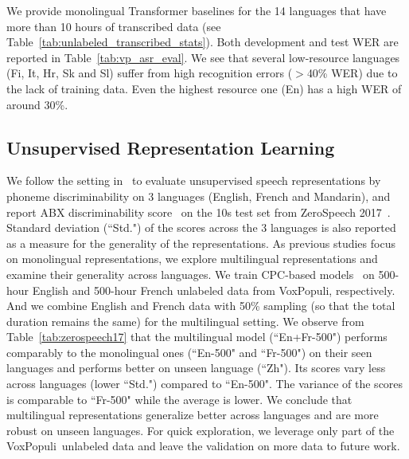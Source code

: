 \documentclass[11pt,a4paper]{article}
\newcommand{\vp}{VoxPopuli}
\begin{document}
We provide monolingual Transformer baselines for the 14 languages that have more than 10 hours of transcribed data (see Table~\ref{tab:unlabeled_transcribed_stats}). Both development and test WER are reported in Table~\ref{tab:vp_asr_eval}. We see that several low-resource languages (Fi, It, Hr, Sk and Sl) suffer from high recognition errors ($>$40\% WER) due to the lack of training data. Even the highest resource one (En) has a high WER of around 30\%.


\subsection{Unsupervised Representation Learning}
\label{sec:representation_learning}
We follow the setting in~\citet{riviere2020unsupervised} to evaluate unsupervised speech representations by phoneme discriminability on 3 languages (English, French and Mandarin), and report ABX discriminability score~\citep{schatz2013evaluating} on the 10s test set from ZeroSpeech 2017~\citep{dunbar2017zero}. Standard deviation (``Std.") of the scores across the 3 languages is also reported as a measure for the generality of the representations. 
As previous studies focus on monolingual representations, we explore multilingual representations and examine their generality across languages.
We train CPC-based models~\citep{riviere2020unsupervised_wild} on 500-hour English and 500-hour French unlabeled data from \vp, respectively. And we combine English and French data with 50\% sampling (so that the total duration remains the same) for the multilingual setting.
We observe from Table~\ref{tab:zerospeech17} that the multilingual model (``En+Fr-500") performs comparably to the monolingual ones (``En-500" and ``Fr-500") on their seen languages and performs better on unseen language (``Zh"). Its scores vary less across languages (lower ``Std.") compared to ``En-500". The variance of the scores is comparable to ``Fr-500" while the average is lower. We conclude that multilingual representations generalize better across languages and are more robust on unseen languages. For quick exploration, we leverage only part of the \vp~unlabeled data and leave the validation on more data to future work.

\end{document}
